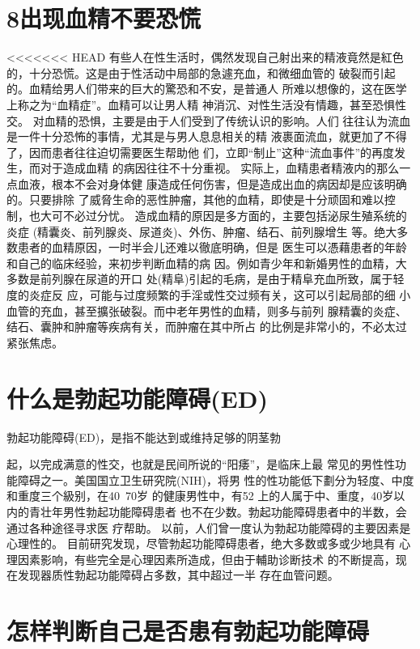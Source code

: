 \documentclass[12pt,UTF8]{ctexbook}
\begin{document}
\section{8出现血精不要恐慌}
<<<<<<< HEAD
有些人在性生活时，偶然发现自己射出来的精液竟然是紅色
的，十分恐慌。这是由于性活动中局部的急遽充血，和微细血管的
破裂而引起的。血精给男人们带来的巨大的驚恐和不安，是普通人
所难以想像的，这在医学上称之为“血精症”。血精可以让男人精
神消沉、对性生活没有情趣，甚至恐惧性交。
对血精的恐惧，主要是由于人们受到了传统认识的影响。人们
往往认为流血是一件十分恐怖的事情，尤其是与男人息息相关的精
液裹面流血，就更加了不得了，因而患者往往迫切需要医生帮助他
们，立即“制止”这种“流血事件”的再度发生，而对于造成血精
的病因往往不十分重视。
实际上，血精患者精液内的那么一点血液，根本不会对身体健
康造成任何伤害，但是造成出血的病因却是应该明确的。只要排除
了威脅生命的恶性肿瘤，其他的血精，即使是十分顽固和难以控
制，也大可不必过分忧。
造成血精的原因是多方面的，主要包括泌尿生殖系统的炎症
(精囊炎、前列腺炎、尿道炎)、外伤、肿瘤、结石、前列腺增生
等。绝大多数患者的血精原因，一时半会儿还难以徹底明确，但是
医生可以憑藉患者的年龄和自己的临床经验，来初步判断血精的病
因。例如青少年和新婚男性的血精，大多数是前列腺在尿道的开口
处(精阜)引起的毛病，是由于精阜充血所致，属于轻度的炎症反
应，可能与过度频繁的手淫或性交过频有关，这可以引起局部的细
小血管的充血，甚至擴张破裂。而中老年男性的血精，则多与前列
腺精囊的炎症、结石、囊肿和肿瘤等疾病有关，而肿瘤在其中所占
的比例是非常小的，不必太过紧张焦虑。
\section{什么是勃起功能障碍(ED)}
勃起功能障碍(ED)，是指不能达到或维持足够的阴茎勃

起，以完成满意的性交，也就是民间所说的“阳痿”，是临床上最
常见的男性性功能障碍之一。美国国立卫生研究院(NIH)，将男
性的性功能低下劃分为轻度、中度和重度三个級别，在40~70岁
的健康男性中，有52%
上的人属于中、重度，40岁以内的青壮年男性勃起功能障碍患者
也不在少数。勃起功能障碍患者中的半数，会通过各种途径寻求医
疗帮助。
以前，人们曾一度认为勃起功能障碍的主要因素是心理性的。
目前研究发现，尽管勃起功能障碍患者，绝大多数或多或少地具有
心理因素影响，有些完全是心理因素所造成，但由于輔助诊断技术
的不断提高，现在发现器质性勃起功能障碍占多数，其中超过一半
存在血管问题。

\section{怎样判断自己是否患有勃起功能障碍}
\end{document}
